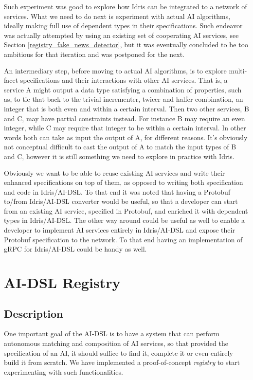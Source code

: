 \documentclass[]{report}
\begin{document}
Such experiment was good to explore how Idris can be integrated to a
network of services.  What we need to do next is experiment with
actual AI algorithms, ideally making full use of dependent types in
their specifications.  Such endeavor was actually attempted by using
an existing set of cooperating AI services, see Section
\ref{registry_fake_news_detector}, but it was eventually concluded to
be too ambitious for that iteration and was postponed for the next.

An intermediary step, before moving to actual AI algorithms, is to
explore multi-facet specifications and their interactions with other
AI services.  That is, a service A might output a data type satisfying
a combination of properties, such as, to tie that back to the trivial
incrementer, twicer and halfer combination, an integer that is both
even and within a certain interval.  Then two other services, B and C,
may have partial constraints instead.  For instance B may require an
even integer, while C may require that integer to be within a certain
interval.  In other words both can take as input the output of A, for
different reasons.  It's obviously not conceptual difficult to cast
the output of A to match the input types of B and C, however it is
still something we need to explore in practice with Idris.

Obviously we want to be able to reuse existing AI services and write
their enhanced specifications on top of them, as opposed to writing
both specification and code in Idris/AI-DSL.  To that end it was noted
that having a Protobuf to/from Idris/AI-DSL converter would be useful,
so that a developer can start from an existing AI service, specified
in Protobuf, and enriched it with dependent types in Idris/AI-DSL.
The other way around could be useful as well to enable a developer to
implement AI services entirely in Idris/AI-DSL and expose their
Protobuf specification to the network.  To that end having an
implementation of gRPC for Idris/AI-DSL could be handy as well.

\section{AI-DSL Registry}
\label{aidsl_registry}

\subsection{Description}

One important goal of the AI-DSL is to have a system that can perform
autonomous matching and composition of AI services, so that provided
the specification of an AI, it should suffice to find it, complete it
or even entirely build it from scratch.  We have implemented a
proof-of-concept \emph{registry} to start experimenting with such
functionalities.
\end{document}

